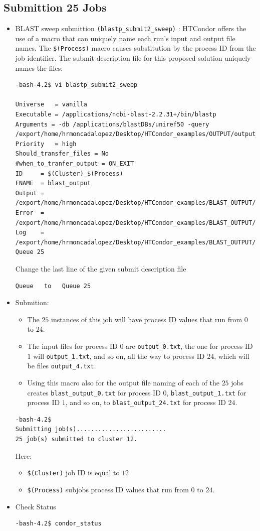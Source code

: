 \documentclass{article}
\begin{document}
\subsection{Submittion 25 Jobs}
\begin{itemize}
\item BLAST sweep submittion \verb+(blastp_submit2_sweep)+ : %
HTCondor offers the use of a macro that can uniquely name each run's input and output file names. The \verb+$(Process)+ macro causes substitution by the process ID from
the job identifier. The submit description file for this proposed solution uniquely names the files:
\scriptsize\begin{verbatim}
-bash-4.2$ vi blastp_submit2_sweep

Universe   = vanilla
Executable = /applications/ncbi-blast-2.2.31+/bin/blastp
Arguments = -db /applications/blastDBs/uniref50 -query /export/home/hrmoncadalopez/Desktop/HTCondor_examples/OUTPUT/output_$(Process).txt
Priority   = high
Should_transfer_files = No
#when_to_tranfer_output = ON_EXIT
ID     = $(Cluster)_$(Process)
FNAME  = blast_output
Output = /export/home/hrmoncadalopez/Desktop/HTCondor_examples/BLAST_OUTPUT/$(FNAME)_$(ID).out
Error  = /export/home/hrmoncadalopez/Desktop/HTCondor_examples/BLAST_OUTPUT/$(FNAME)_$(ID).err
Log    = /export/home/hrmoncadalopez/Desktop/HTCondor_examples/BLAST_OUTPUT/$(FNAME)_$(ID).log
Queue 25
\end{verbatim}
\normalsize
Change the last line of the given submit description file
\scriptsize
\begin{verbatim}
Queue   to   Queue 25
\end{verbatim}
\normalsize
\item Submition:
\begin{itemize}
 \item The $25$ instances of this job will have process ID values that run from $0$ to $24$. 
 \item The input files for process ID $0$ are \verb+output_0.txt+, the one for process ID $1$ will \verb+output_1.txt+, and so on, all the way to process ID $24$, which will be files \verb+output_4.txt+.
 \item Using this macro also for the output file naming of each of the $25$ jobs creates \verb+blast_output_0.txt+  for process ID $0$, \verb+blast_output_1.txt+ for process ID $1$, and so on, to \verb+blast_output_24.txt+ for process ID $24$.
\end{itemize}
\scriptsize
\begin{verbatim}
-bash-4.2$ 
Submitting job(s).........................
25 job(s) submitted to cluster 12.
\end{verbatim}
\normalsize
Here: 
\begin{itemize}
 \item \verb+$(Cluster)+ job ID is equal to $12$ 
 \item \verb+$(Process)+ subjobs process ID values that run from $0$ to $24$. 
\end{itemize}
\normalsize
\item Check Status
\scriptsize
\begin{verbatim}
-bash-4.2$ condor_status


\end{verbatim}
\end{itemize}
\end{document}
